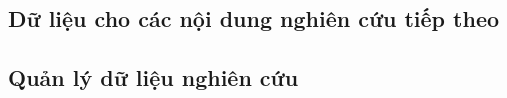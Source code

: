 \par{}
\subsection{Dữ liệu cho các nội dung nghiên cứu tiếp theo}\label{subsection:data-8}

\par{}
\subsection{Quản lý dữ liệu nghiên cứu}\label{subsection:data-9}

